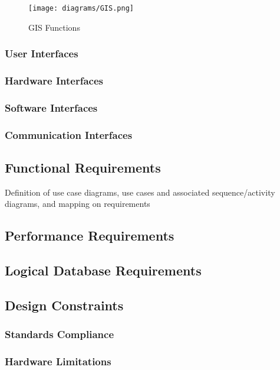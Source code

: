	\begin{figure}[h]
		\centering
		\texttt{[image: diagrams/GIS.png]}
		\caption{
			\label{fig:externalGIS} GIS Functions}
	\end{figure}

\subsubsection{User Interfaces}
\label{sec:3userinterface}

\subsubsection{Hardware Interfaces}
\subsubsection{Software Interfaces}
\subsubsection{Communication Interfaces}


\subsection{Functional Requirements}
Definition of use case diagrams, use cases and associated sequence/activity diagrams, and mapping on requirements

\subsection{Performance Requirements}

\subsection{Logical Database Requirements}

\subsection{Design Constraints}

\subsubsection{Standards Compliance}
\subsubsection{Hardware Limitations}
